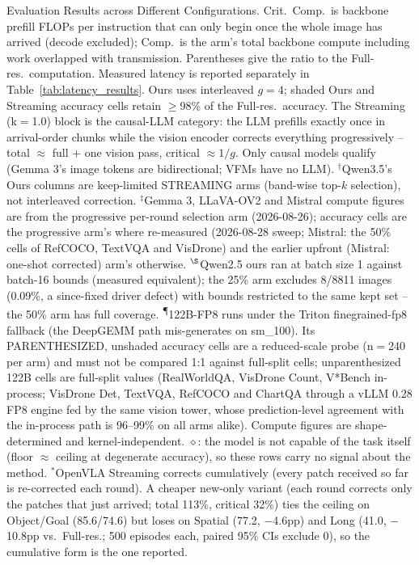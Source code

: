 \begin{table}[t]
\vspace{-0.1in}
\caption{Evaluation Results across Different Configurations. Crit.\ Comp.\ is backbone prefill FLOPs per instruction that can only begin once the whole image has arrived (decode excluded); Comp.\ is the arm's total backbone compute including work overlapped with transmission. Parentheses give the ratio to the Full-res.\ computation. Measured latency is reported separately in Table~\ref{tab:latency_results}. Ours uses interleaved $g{=}4$; shaded Ours and Streaming accuracy cells retain $\geq$98\% of the Full-res.\ accuracy. The Streaming (k$=$1.0) block is the causal-LLM category: the LLM prefills exactly once in arrival-order chunks while the vision encoder corrects everything progressively -- total $\approx$ full + one vision pass, critical $\approx 1/g$. Only causal models qualify (Gemma 3's image tokens are bidirectional; VFMs have no LLM). $^\dagger$Qwen3.5's Ours columns are keep-limited STREAMING arms (band-wise top-$k$ selection), not interleaved correction. $^\ddagger$Gemma 3, LLaVA-OV2 and Mistral compute figures are from the progressive per-round selection arm (2026-08-26); accuracy cells are the progressive arm's where re-measured (2026-08-28 sweep; Mistral: the 50\% cells of RefCOCO, TextVQA and VisDrone) and the earlier upfront (Mistral: one-shot corrected) arm's otherwise. $^\S$Qwen2.5 ours ran at batch size 1 against batch-16 bounds (measured equivalent); the 25\% arm excludes 8/8811 images (0.09\%, a since-fixed driver defect) with bounds restricted to the same kept set -- the 50\% arm has full coverage. \textsuperscript{\P}122B-FP8 runs under the Triton finegrained-fp8 fallback (the DeepGEMM path mis-generates on sm\_100). Its PARENTHESIZED, unshaded accuracy cells are a reduced-scale probe (n$=$240 per arm) and must not be compared 1:1 against full-split cells; unparenthesized 122B cells are full-split values (RealWorldQA, VisDrone Count, V*Bench in-process; VisDrone Det, TextVQA, RefCOCO and ChartQA through a vLLM 0.28 FP8 engine fed by the same vision tower, whose prediction-level agreement with the in-process path is 96--99\% on all arms alike). Compute figures are shape-determined and kernel-independent. $\diamond$: the model is not capable of the task itself (floor $\approx$ ceiling at degenerate accuracy), so these rows carry no signal about the method. $^\ast$OpenVLA Streaming corrects cumulatively (every patch received so far is re-corrected each round). A cheaper new-only variant (each round corrects only the patches that just arrived; total 113\%, critical 32\%) ties the ceiling on Object/Goal (85.6/74.6) but loses on Spatial (77.2, $-$4.6pp) and Long (41.0, $-$10.8pp vs.\ Full-res.; 500 episodes each, paired 95\% CIs exclude 0), so the cumulative form is the one reported.}

\end{table}

